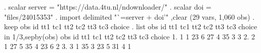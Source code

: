 . scalar server = "https://data.4tu.nl/ndownloader/"
{\smallskip}
. scalar doi = "files/24015353"
{\smallskip}
. import delimited   "`=server + doi'" ,clear
(29 vars, 1,060 obs)
{\smallskip}
. keep obs id   tt1 tc1 tt2 tc2 tt3 tc3 choice 
{\smallskip}
. list obs id   tt1 tc1 tt2 tc2 tt3 tc3 choice in 1/3,sepby(obs)
{\smallskip}
     {\TLC}
     {\VBAR} obs   id   tt1   tc1   tt2   tc2   tt3   tc3   choice {\VBAR}
     {\LFTT}
  1. {\VBAR}   1    1    23     6    27     4    35     3        3 {\VBAR}
     {\LFTT}
  2. {\VBAR}   2    1    27     5    35     4    23     6        2 {\VBAR}
     {\LFTT}
  3. {\VBAR}   3    1    35     3    23     5    31     4        1 {\VBAR}
     {\BLC}
